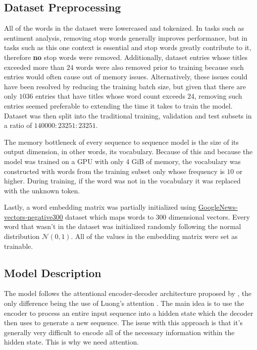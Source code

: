 \documentclass{article}
\begin{document}
\subsection{Dataset Preprocessing}

All of the words in the dataset were lowercased and tokenized. In tasks such as sentiment analysis, removing stop words generally improves performance, but in tasks such as this one context is essential and stop words greatly contribute to it, therefore \textbf{no} stop words were removed. Additionally, dataset entries whose titles exceeded more than $24$ words were also removed prior to training because such entries would often cause out of memory issues. Alternatively, these issues could have been resolved by reducing the training batch size, but given that there are only $1036$ entries that have titles whose word count exceeds $24$, removing such entries seemed preferable to extending the time it takes to train the model. Dataset was then split into the traditional training, validation and test subsets in a ratio of $140000:23251:23251$.

The memory bottleneck of every sequence to sequence model is the size of its output dimension, in other words, its vocabulary. Because of this and because the model was trained on a GPU with only 4 GiB of memory, the vocabulary was constructed with words from the training subset only whose frequency is $10$ or higher. During training, if the word was not in the vocabulary it was replaced with the unknown token.

Lastly, a word embedding matrix was partially initialized using \href{https://www.kaggle.com/datasets/leadbest/googlenewsvectorsnegative300}{GoogleNews-vectors-negative300} dataset which maps words to 300 dimensional vectors. Every word that wasn't in the dataset was initialized randomly following the normal distribution $\mathcal{N}(0, 1)$. All of the values in the embedding matrix were set as trainable.

\subsection{Model Description}

The model follows the attentional encoder-decoder architecture proposed by \cite{bahdanau}, the only difference being the use of Luong's attention \citep{luong}. The main idea is to use the encoder to process an entire input sequence into a hidden state which the decoder then uses to generate a new sequence. The issue with this approach is that it's generally very difficult to encode all of the necessary information within the hidden state. This is why we need attention.
\end{document}
